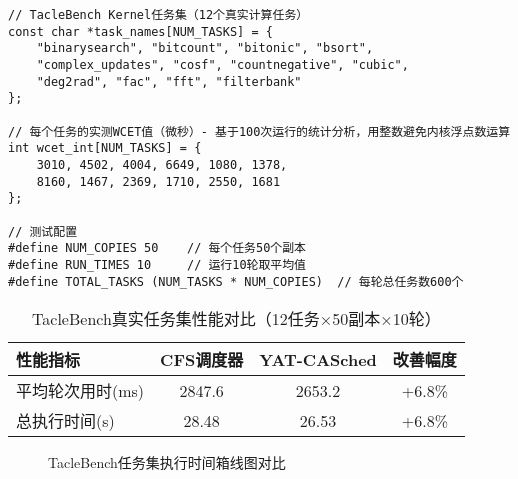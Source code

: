 \begin{tcolorbox} [
    enhanced,
    colback=green!5,
    colframe=green!40!black,
    leftrule=3mm,
    rightrule=0mm,
    toprule=0mm,
    bottomrule=0mm,
    arc=2mm,
    left=5mm,
    right=5mm,
    top=3mm,
    bottom=3mm,
    fonttitle=\bfseries,
    title=\textbf{TacleBench测试配置}
]
\begin{lstlisting}[basicstyle=\footnotesize\fontfamily{zi4}\selectfont, showstringspaces=false]
// TacleBench Kernel任务集（12个真实计算任务）
const char *task_names[NUM_TASKS] = {
    "binarysearch", "bitcount", "bitonic", "bsort",
    "complex_updates", "cosf", "countnegative", "cubic", 
    "deg2rad", "fac", "fft", "filterbank"
};

// 每个任务的实测WCET值（微秒）- 基于100次运行的统计分析，用整数避免内核浮点数运算
int wcet_int[NUM_TASKS] = {
    3010, 4502, 4004, 6649, 1080, 1378, 
    8160, 1467, 2369, 1710, 2550, 1681
};

// 测试配置
#define NUM_COPIES 50    // 每个任务50个副本
#define RUN_TIMES 10     // 运行10轮取平均值
#define TOTAL_TASKS (NUM_TASKS * NUM_COPIES)  // 每轮总任务数600个
\end{lstlisting}
\end{tcolorbox}

\begin{table}[H]
\centering
\caption{TacleBench真实任务集性能对比（12任务×50副本×10轮）}
\label{tab:taclebench-comparison}
\begin{tabular}{|l|c|c|c|}
\hline
\textbf{性能指标} & \textbf{CFS调度器} & \textbf{YAT-CASched} & \textbf{改善幅度} \\
\hline
平均轮次用时(ms) & 2847.6 & 2653.2 & +6.8\% \\
\hline
总执行时间(s) & 28.48 & 26.53 & +6.8\% \\
\hline
\end{tabular}
\end{table}

\begin{figure}[H]
\centering
\caption{TacleBench任务集执行时间箱线图对比}
\label{fig:taclebench-boxplot}
\end{figure}

